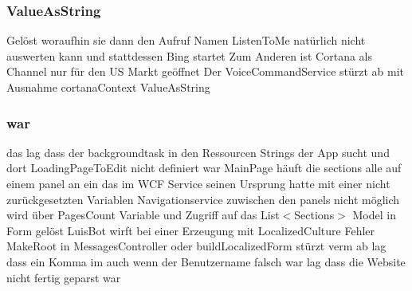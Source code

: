 \mbox{\label{_r_e_a_d_m_e_8txt_a5efed622080494c17160e34d1aa15886}} 
\subsubsection{\texorpdfstring{Value\+As\+String}{ValueAsString}}
{\footnotesize\ttfamily Gelöst woraufhin sie dann den Aufruf Namen Listen\+To\+Me natürlich nicht auswerten kann und stattdessen Bing startet Zum Anderen ist Cortana als Channel nur für den US Markt geöffnet Der Voice\+Command\+Service stürzt ab mit Ausnahme cortana\+Context Value\+As\+String}

\mbox{\label{_r_e_a_d_m_e_8txt_a2a72fc7da943588cba8c302409b22e53}} 
\subsubsection{\texorpdfstring{war}{war}}
{\footnotesize\ttfamily das lag dass der backgroundtask in den Ressourcen Strings der App sucht und dort Loading\+Page\+To\+Edit nicht definiert war Main\+Page häuft die sections alle auf einem panel an ein das im W\+CF Service seinen Ursprung hatte mit einer nicht zurückgesetzten Variablen Navigationservice zuwischen den panels nicht möglich wird über Pages\+Count Variable und Zugriff auf das List$<$Sections$>$ Model in Form gelöst Luis\+Bot wirft bei einer Erzeugung mit Localized\+Culture Fehler Make\+Root in Messages\+Controller oder build\+Localized\+Form stürzt verm ab lag dass ein Komma im auch wenn der Benutzername falsch war lag dass die Website nicht fertig geparst war}

